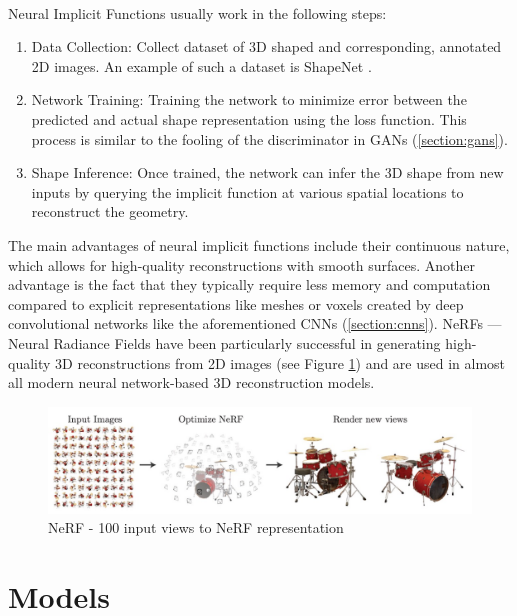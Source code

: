 \paragraph{}
Neural Implicit Functions usually work in the following steps:
\begin{enumerate}
    \item Data Collection: Collect dataset of 3D shaped and corresponding, annotated 2D images. An example of such a dataset is ShapeNet \autocite{chang_shapenet_2015}.
    \item Network Training: Training the network to minimize error between the predicted and actual shape representation using the loss function. This process is similar to the fooling of the discriminator in GANs (\ref{section:gans}).
    \item Shape Inference: Once trained, the network can infer the 3D shape from new inputs by querying the implicit function at various spatial locations to reconstruct the geometry.
\end{enumerate}

The main advantages of neural implicit functions include their continuous nature, which allows for high-quality reconstructions with smooth surfaces. Another advantage is the fact that they typically require less memory and computation compared to explicit representations like meshes or voxels created by deep convolutional networks like the aforementioned CNNs (\ref{section:cnns}).
NeRFs — Neural Radiance Fields \autocite{mildenhall_nerf_2021} have been particularly successful in generating high-quality 3D reconstructions from 2D images (see Figure \ref{fig:nerf}) and are used in almost all modern neural network-based 3D reconstruction models.


\begin{figure}
    \centering
    \includegraphics[width=1\linewidth]{images/nerf.jpg}
    \caption{NeRF - 100 input views to NeRF representation  \autocite{mildenhall_nerf_2021}}
    \label{fig:nerf}
\end{figure}

\section{Models}

